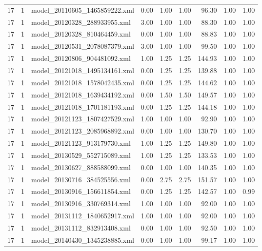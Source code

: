 \begin{table}[ht]
\begin{tabular}{rrlrrrrrr}
   17 &   1 & model\_20110605\_1465859222.xml & 0.00 & 1.00 & 1.00 & 96.30 & 1.00 & 1.00 \\ 
   17 &   1 & model\_20120328\_288933955.xml & 3.00 & 1.00 & 1.00 & 88.30 & 1.00 & 1.00 \\ 
   17 &   1 & model\_20120328\_810464459.xml & 0.00 & 1.00 & 1.00 & 88.83 & 1.00 & 1.00 \\ 
   17 &   1 & model\_20120531\_2078087379.xml & 3.00 & 1.00 & 1.00 & 99.50 & 1.00 & 1.00 \\ 
   17 &   1 & model\_20120806\_904481092.xml & 1.00 & 1.25 & 1.25 & 144.93 & 1.00 & 1.00 \\ 
   17 &   1 & model\_20121018\_1495134161.xml & 0.00 & 1.25 & 1.25 & 139.88 & 1.00 & 1.00 \\ 
   17 &   1 & model\_20121018\_1578042435.xml & 0.00 & 1.25 & 1.25 & 144.62 & 1.00 & 1.00 \\ 
   17 &   1 & model\_20121018\_1639434192.xml & 0.00 & 1.50 & 1.50 & 149.57 & 1.00 & 1.00 \\ 
   17 &   1 & model\_20121018\_1701181193.xml & 0.00 & 1.25 & 1.25 & 144.18 & 1.00 & 1.00 \\ 
   17 &   1 & model\_20121123\_1807427529.xml & 1.00 & 1.00 & 1.00 & 92.90 & 1.00 & 1.00 \\ 
   17 &   1 & model\_20121123\_2085968892.xml & 0.00 & 1.00 & 1.00 & 130.70 & 1.00 & 1.00 \\ 
   17 &   1 & model\_20121123\_913179730.xml & 1.00 & 1.25 & 1.25 & 149.80 & 1.00 & 1.00 \\ 
   17 &   1 & model\_20130529\_552715089.xml & 1.00 & 1.25 & 1.25 & 133.53 & 1.00 & 1.00 \\ 
   17 &   1 & model\_20130627\_888588099.xml & 0.00 & 1.00 & 1.00 & 140.35 & 1.00 & 1.00 \\ 
   17 &   1 & model\_20130716\_384525556.xml & 0.00 & 2.75 & 2.75 & 151.57 & 1.00 & 1.00 \\ 
   17 &   1 & model\_20130916\_156611854.xml & 0.00 & 1.25 & 1.25 & 142.57 & 1.00 & 0.99 \\ 
   17 &   1 & model\_20130916\_330769314.xml & 1.00 & 1.00 & 1.00 & 92.00 & 1.00 & 1.00 \\ 
   17 &   1 & model\_20131112\_1840652917.xml & 1.00 & 1.00 & 1.00 & 92.00 & 1.00 & 1.00 \\ 
   17 &   1 & model\_20131112\_832913408.xml & 0.00 & 1.00 & 1.00 & 92.50 & 1.00 & 1.00 \\ 
   17 &   1 & model\_20140430\_1345238885.xml & 0.00 & 1.00 & 1.00 & 99.17 & 1.00 & 1.00 \\ 

\end{tabular}
\end{table}
